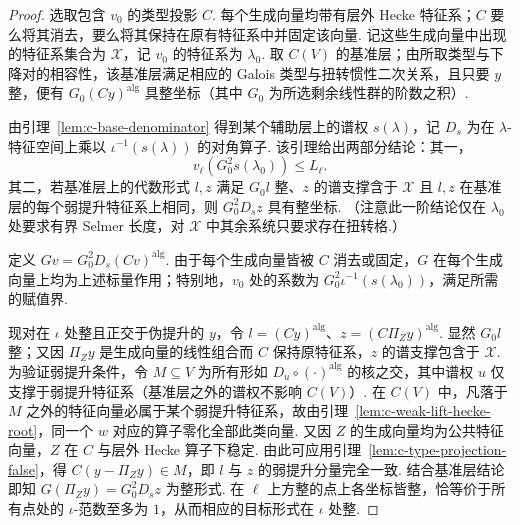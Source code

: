 \begin{proof}
选取包含 $v_0$ 的类型投影 $C$. 每个生成向量均带有层外 Hecke 特征系；$C$ 要么将其消去，要么将其保持在原有特征系中并固定该向量.
记这些生成向量中出现的特征系集合为 $\mathcal X$，记 $v_0$ 的特征系为 $\lambda_0$.
取 $C(V)$ 的基准层；由所取类型与下降对的相容性，该基准层满足相应的 Galois 类型与扭转惯性二次关系，且只要 $y$ 整，便有 $G_0(Cy)^{\mathrm{alg}}$ 具整坐标（其中 $G_0$ 为所选剩余线性群的阶数之积）.

由引理~\ref{lem:c-base-denominator} 得到某个辅助层上的谱权 $s(\lambda)$，记 $D_s$ 为在 $\lambda$-特征空间上乘以 $\iota^{-1}(s(\lambda))$ 的对角算子.
该引理给出两部分结论：其一，
\[
 v_\ell(G_0^2s(\lambda_0))\le L_\ell .
\]
其二，若基准层上的代数形式 $l,z$ 满足 $G_0l$ 整、$z$ 的谱支撑含于 $\mathcal X$ 且 $l,z$ 在基准层的每个弱提升特征系上相同，则 $G_0^2 D_s z$ 具有整坐标. （注意此一阶结论仅在 $\lambda_0$ 处要求有界 Selmer 长度，对 $\mathcal X$ 中其余系统只要求存在扭转格.）

定义 $Gv=G_0^2D_s(Cv)^{\mathrm{alg}}$. 由于每个生成向量皆被 $C$ 消去或固定，$G$ 在每个生成向量上均为上述标量作用；特别地，$v_0$ 处的系数为 $G_0^2\iota^{-1}(s(\lambda_0))$，满足所需的赋值界.

现对在 $\iota$ 处整且正交于伪提升的 $y$，令 $l=(Cy)^{\mathrm{alg}}$、$z=(C\Pi_Zy)^{\mathrm{alg}}$. 显然 $G_0l$ 整；又因 $\Pi_Zy$ 是生成向量的线性组合而 $C$ 保持原特征系，$z$ 的谱支撑包含于 $\mathcal X$. 为验证弱提升条件，令 $M\subseteq V$ 为所有形如 $D_u\circ(\cdot)^{\mathrm{alg}}$ 的核之交，其中谱权 $u$ 仅支撑于弱提升特征系（基准层之外的谱权不影响 $C(V)$）. 在 $C(V)$ 中，凡落于 $M$ 之外的特征向量必属于某个弱提升特征系，故由引理~\ref{lem:c-weak-lift-hecke-root}，同一个 $w$ 对应的算子零化全部此类向量. 又因 $Z$ 的生成向量均为公共特征向量，$Z$ 在 $C$ 与层外 Hecke 算子下稳定. 由此可应用引理~\ref{lem:c-type-projection-false}，得 $C(y-\Pi_Zy)\in M$，即 $l$ 与 $z$ 的弱提升分量完全一致. 结合基准层结论即知 $G(\Pi_Zy)=G_0^2D_s z$ 为整形式. 在 $\ell$ 上方整的点上各坐标皆整，恰等价于所有点处的 $\iota$-范数至多为 $1$，从而相应的目标形式在 $\iota$ 处整.
\end{proof}

